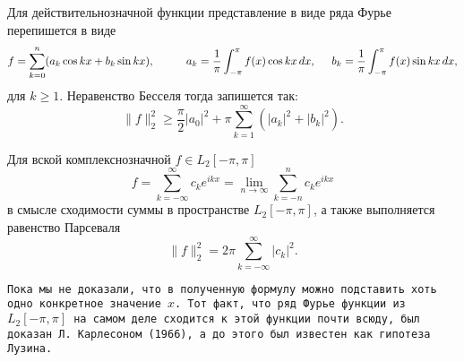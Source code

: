 \begin{to_lem}
    Для действительнозначной функции представление в виде ряда Фурье перепишется в виде
    \begin{equation*}
        f = \sum_{k=0}^{n} (a_k \cos kx + b_k \sin kx),
        \hspace{1 cm}
        a_k = \frac{1}{\pi}\int_{-\pi}^{\pi} f(x) \cos kx \, d x,
        \hspace{0.5 cm}
        b_k = \frac{1}{\pi} \int_{-\pi}^{\pi} f(x) \sin kx \, d x,
    \end{equation*}
    для $k \geq 1$. Неравенство Бесселя тогда запишется так:
    \begin{equation*}
        \|f\|_2^2 \geq \frac{\pi}{2} |a_0|^2 + 
        \pi \sum_{k=1}^{\infty} (|a_k|^2 + |b_k|^2).
    \end{equation*}
\end{to_lem}

\begin{to_thr}
    Для вской комплекснозначной $f \in L_2 [-\pi, \pi]$
    \begin{equation*}
        f = \sum_{k=-\infty}^{\infty} 
        c_k e^{ikx} = 
        \lim_{n \to \infty} \sum_{k=-n}^{n} c_k e^{ikx}
    \end{equation*}
    в смысле сходимости суммы в пространстве $L_2[-\pi, \pi]$, а также выполняется равенство Парсеваля
    \begin{equation*}
        \|f\|_2^2 = 2 \pi \sum_{k=-\infty}^{\infty} |c_k|^2.
    \end{equation*}
\end{to_thr}

\texttt{Пока мы не доказали, что в полученную формулу можно подставить хоть одно конкретное значение $x$. Тот факт, что ряд Фурье функции из
$L_2[-\pi, \pi]$ на самом деле сходится к этой функции почти всюду, был доказан Л. Карлесоном (1966), а до этого был известен как гипотеза Лузина.} 